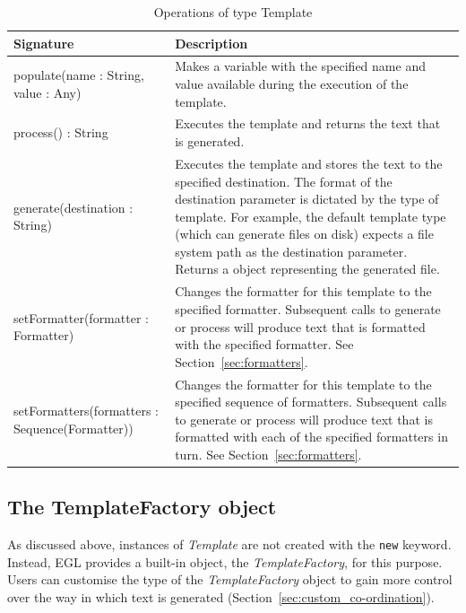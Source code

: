\begin{longtabu} {|p{5.5cm}|X|}
			
			\caption{Operations of type Template}
			\label{tab:TemplateOperations}\\
			
			\hline
							
			\textbf{Signature} & \textbf{Description} \\\hline
			
			populate(name : String, value : Any) & Makes a variable with the specified name and value available during the execution of the template. \\\hline
			
			process() : String & Executes the template and returns the text that is generated.  \\\hline
			
			generate(destination : String) & Executes the template and stores the text to the specified destination. The format of the destination parameter is dictated by the type of template. For example, the default template type (which can generate files on disk) expects a file system path as the destination parameter. Returns a  object representing the generated file.\\\hline
			
			setFormatter(formatter : Formatter) & Changes the formatter for this template to the specified formatter. Subsequent calls to generate or process will produce text that is formatted with the specified formatter. See Section~\ref{sec:formatters}. \\\hline
			
			setFormatters(formatters : Sequence(Formatter)) & Changes the formatter for this template to the specified sequence of formatters. Subsequent calls to generate or process will produce text that is formatted with each of the specified formatters in turn. See Section~\ref{sec:formatters}. \\\hline
\end{longtabu}


\subsection{The TemplateFactory object}
As discussed above, instances of \emph{Template} are not created with the \texttt{new} keyword. Instead, EGL provides a built-in object, the \emph{TemplateFactory}, for this purpose. Users can customise the type of the \emph{TemplateFactory} object to gain more control over the way in which text is generated (Section~\ref{sec:custom_co-ordination}).

